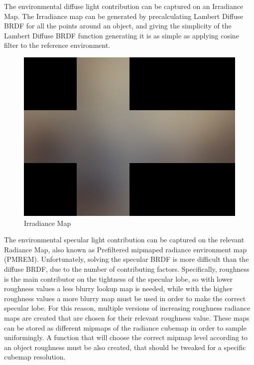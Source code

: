 The environmental diffuse light contribution can be captured on an Irradiance Map. The Irradiance map can be generated
by precalculating Lambert Diffuse BRDF for all the points around an object, and giving the simplicity of the Lambert Diffuse BRDF
function generating it is as simple as applying cosine filter to the reference environment.

\begin{figure}[ht]
    \centering
    \includegraphics[scale=0.18,clip=true]{./image/envl_irr.png}
    \caption{Irradiance Map}
\label{fig:envlirr}
\end{figure}

The environmental specular light contribution can be captured on the relevant Radiance Map, also known as Prefiltered mipmaped
radiance environment map (PMREM). Unfortunately, solving the specular BRDF is more difficult than the diffuse BRDF, due to the number of
contributing factors. Specifically, roughness is the main contributor on the tightness of the specular lobe, so with lower roughness
values a less blurry lookup map is needed, while with the higher roughness values a more blurry map must be used in order to make
the correct specular lobe. For this reason, multiple versions of increasing roughness radiance maps are created that are chosen
for their relevant roughness value. These maps can be stored as different mipmaps of the radiance cubemap in order to sample uniformingly.
A function that will choose the correct mipmap level according to an object roughness must be also created, that should be tweaked
for a specific cubemap resolution.

